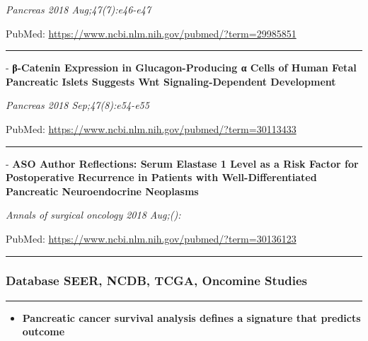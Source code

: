 \documentclass[]{article}
\providecommand{\tightlist}{%
  \setlength{\itemsep}{0pt}\setlength{\parskip}{0pt}}
\begin{document}
\emph{Pancreas 2018 Aug;47(7):e46-e47}

PubMed: \url{https://www.ncbi.nlm.nih.gov/pubmed/?term=29985851}

{}

{}

\begin{center}\rule{0.5\linewidth}{\linethickness}\end{center}

 - \textbf{β-Catenin Expression in Glucagon-Producing α Cells of Human
Fetal Pancreatic Islets Suggests Wnt Signaling-Dependent Development}

\emph{Pancreas 2018 Sep;47(8):e54-e55}

PubMed: \url{https://www.ncbi.nlm.nih.gov/pubmed/?term=30113433}

{}

{}

\begin{center}\rule{0.5\linewidth}{\linethickness}\end{center}

 - \textbf{ASO Author Reflections: Serum Elastase 1 Level as a Risk
Factor for Postoperative Recurrence in Patients with Well-Differentiated
Pancreatic Neuroendocrine Neoplasms}

\emph{Annals of surgical oncology 2018 Aug;():}

PubMed: \url{https://www.ncbi.nlm.nih.gov/pubmed/?term=30136123}

{}

{}

\begin{center}\rule{0.5\linewidth}{\linethickness}\end{center}

\hypertarget{database-seer-ncdb-tcga-oncomine-studies}{%
\subsubsection{Database SEER, NCDB, TCGA, Oncomine
Studies}\label{database-seer-ncdb-tcga-oncomine-studies}}

\begin{center}\rule{0.5\linewidth}{\linethickness}\end{center}

\begin{itemize}
\tightlist
\item
  \textbf{Pancreatic cancer survival analysis defines a signature that
  predicts outcome}
\end{itemize}
\end{document}
